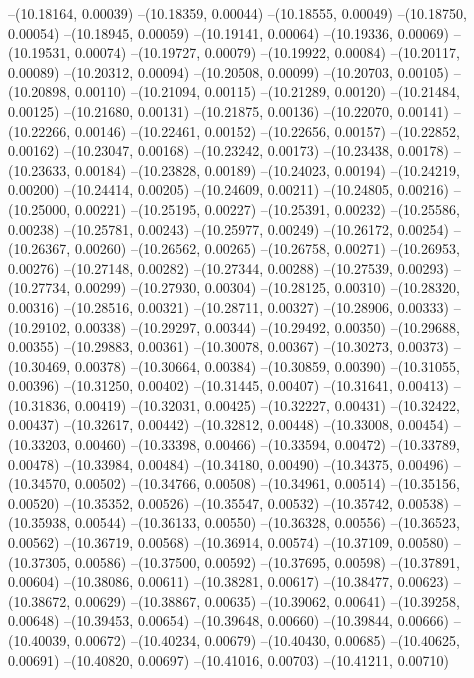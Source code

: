 --(10.18164, 0.00039)
--(10.18359, 0.00044)
--(10.18555, 0.00049)
--(10.18750, 0.00054)
--(10.18945, 0.00059)
--(10.19141, 0.00064)
--(10.19336, 0.00069)
--(10.19531, 0.00074)
--(10.19727, 0.00079)
--(10.19922, 0.00084)
--(10.20117, 0.00089)
--(10.20312, 0.00094)
--(10.20508, 0.00099)
--(10.20703, 0.00105)
--(10.20898, 0.00110)
--(10.21094, 0.00115)
--(10.21289, 0.00120)
--(10.21484, 0.00125)
--(10.21680, 0.00131)
--(10.21875, 0.00136)
--(10.22070, 0.00141)
--(10.22266, 0.00146)
--(10.22461, 0.00152)
--(10.22656, 0.00157)
--(10.22852, 0.00162)
--(10.23047, 0.00168)
--(10.23242, 0.00173)
--(10.23438, 0.00178)
--(10.23633, 0.00184)
--(10.23828, 0.00189)
--(10.24023, 0.00194)
--(10.24219, 0.00200)
--(10.24414, 0.00205)
--(10.24609, 0.00211)
--(10.24805, 0.00216)
--(10.25000, 0.00221)
--(10.25195, 0.00227)
--(10.25391, 0.00232)
--(10.25586, 0.00238)
--(10.25781, 0.00243)
--(10.25977, 0.00249)
--(10.26172, 0.00254)
--(10.26367, 0.00260)
--(10.26562, 0.00265)
--(10.26758, 0.00271)
--(10.26953, 0.00276)
--(10.27148, 0.00282)
--(10.27344, 0.00288)
--(10.27539, 0.00293)
--(10.27734, 0.00299)
--(10.27930, 0.00304)
--(10.28125, 0.00310)
--(10.28320, 0.00316)
--(10.28516, 0.00321)
--(10.28711, 0.00327)
--(10.28906, 0.00333)
--(10.29102, 0.00338)
--(10.29297, 0.00344)
--(10.29492, 0.00350)
--(10.29688, 0.00355)
--(10.29883, 0.00361)
--(10.30078, 0.00367)
--(10.30273, 0.00373)
--(10.30469, 0.00378)
--(10.30664, 0.00384)
--(10.30859, 0.00390)
--(10.31055, 0.00396)
--(10.31250, 0.00402)
--(10.31445, 0.00407)
--(10.31641, 0.00413)
--(10.31836, 0.00419)
--(10.32031, 0.00425)
--(10.32227, 0.00431)
--(10.32422, 0.00437)
--(10.32617, 0.00442)
--(10.32812, 0.00448)
--(10.33008, 0.00454)
--(10.33203, 0.00460)
--(10.33398, 0.00466)
--(10.33594, 0.00472)
--(10.33789, 0.00478)
--(10.33984, 0.00484)
--(10.34180, 0.00490)
--(10.34375, 0.00496)
--(10.34570, 0.00502)
--(10.34766, 0.00508)
--(10.34961, 0.00514)
--(10.35156, 0.00520)
--(10.35352, 0.00526)
--(10.35547, 0.00532)
--(10.35742, 0.00538)
--(10.35938, 0.00544)
--(10.36133, 0.00550)
--(10.36328, 0.00556)
--(10.36523, 0.00562)
--(10.36719, 0.00568)
--(10.36914, 0.00574)
--(10.37109, 0.00580)
--(10.37305, 0.00586)
--(10.37500, 0.00592)
--(10.37695, 0.00598)
--(10.37891, 0.00604)
--(10.38086, 0.00611)
--(10.38281, 0.00617)
--(10.38477, 0.00623)
--(10.38672, 0.00629)
--(10.38867, 0.00635)
--(10.39062, 0.00641)
--(10.39258, 0.00648)
--(10.39453, 0.00654)
--(10.39648, 0.00660)
--(10.39844, 0.00666)
--(10.40039, 0.00672)
--(10.40234, 0.00679)
--(10.40430, 0.00685)
--(10.40625, 0.00691)
--(10.40820, 0.00697)
--(10.41016, 0.00703)
--(10.41211, 0.00710)
